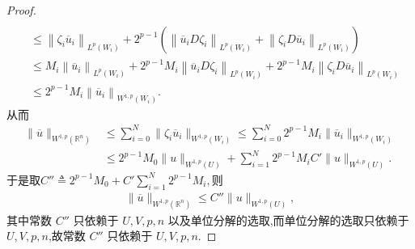 \documentclass[../../main.tex]{subfiles}%
\begin{document}
\begin{proof}
\begin{align*}
\\
&\leqslant \left\| \zeta _i\overline{u}_i \right\| _{L^p\left( W_i \right)}+2^{p-1}\left( \left\| \overline{u}_iD\zeta _i \right\| _{L^p\left( W_i \right)}+\left\| \zeta _iD\overline{u}_i \right\| _{L^p\left( W_i \right)} \right) 
\\
&\leqslant M_i\left\| \overline{u}_i \right\| _{L^p\left( W_i \right)}+2^{p-1}M_i\left\| \overline{u}_iD\zeta _i \right\| _{L^p\left( W_i \right)}+2^{p-1}M_i\left\| \zeta _iD\overline{u}_i \right\| _{L^p\left( W_i \right)}
\\
&\leqslant 2^{p-1}M_i\left\| \overline{u}_i \right\| _{W^{1,p}\left( W_i \right)}.
\end{align*}
从而
\begin{align*}
\parallel \overline{u}\parallel _{W^{1,p}(\mathbb{R} ^n)}&\leqslant \sum_{i=0}^N{\parallel \zeta _i\overline{u}_i}\parallel _{W^{1,p}(W_i)}\leqslant \sum_{i=0}^N{2^{p-1}M_i\parallel \overline{u}_i\parallel _{W^{1,p}(W_i)}}
\\
&\leqslant 2^{p-1}M_0\parallel u\parallel _{W^{1,p}(U)}+\sum_{i=1}^N{2^{p-1}M_iC'}\parallel u\parallel _{W^{1,p}(U)}.
\end{align*}
于是取$C'' \triangleq 2^{p-1}M_0+C' \sum_{i=1}^N{2^{p-1}M_i},$则
\begin{align*}
\|\overline{u}\|_{W^{1,p}(\mathbb{R}^n)}\leqslant C''\|u\|_{W^{1,p}(U)},
\end{align*}
其中常数 \(C''\) 只依赖于 \(U,V,p,n\) 以及单位分解的选取,而单位分解的选取只依赖于\(U,V,p,n\),故常数 \(C''\) 只依赖于 \(U,V,p,n\).


\end{proof}
\end{document}
